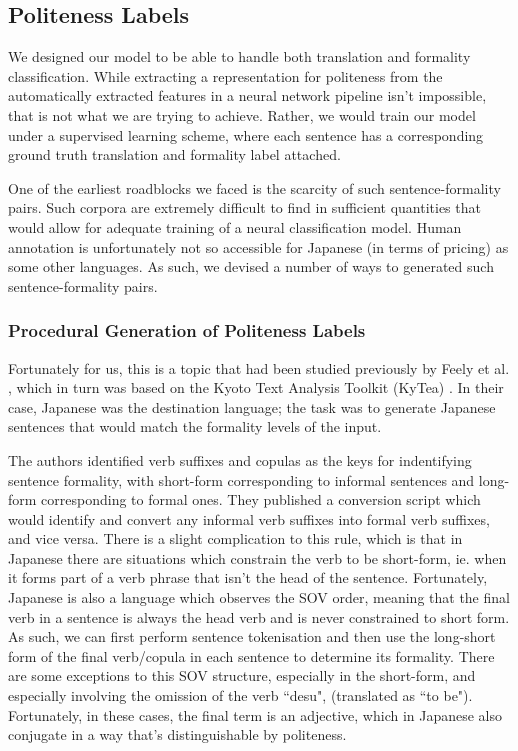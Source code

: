 \documentclass[11pt]{article}
\begin{document}
\subsection{Politeness Labels}

We designed our model to be able to handle both translation and formality classification. While extracting a representation for politeness from the automatically extracted features in a neural network pipeline isn't impossible, that is not what we are trying to achieve. Rather, we would train our model under a supervised learning scheme, where each sentence has a corresponding ground truth translation and formality label attached.

One of the earliest roadblocks we faced is the scarcity of such sentence-formality pairs. Such corpora are extremely difficult to find in sufficient quantities that would allow for adequate training of a neural classification model. Human annotation is unfortunately not so accessible for Japanese (in terms of pricing) as some other languages. As such, we devised a number of ways to generated such sentence-formality pairs.

\subsubsection{Procedural Generation of Politeness Labels}

Fortunately for us, this is a topic that had been studied previously by Feely et al. \cite{Feely:19}, which in turn was based on the Kyoto Text Analysis Toolkit (KyTea) \cite{Neubig:11}. In their case, Japanese was the destination language; the task was to generate Japanese sentences that would match the formality levels of the input. 

The authors identified verb suffixes and copulas as the keys for indentifying sentence formality, with short-form corresponding to informal sentences and long-form corresponding to formal ones. They published a conversion script which would identify and convert any informal verb suffixes into formal verb suffixes, and vice versa. There is a slight complication to this rule, which is that in Japanese there are situations which constrain the verb to be short-form, ie. when it forms part of a verb phrase that isn't the head of the sentence. Fortunately, Japanese is also a language which observes the SOV order, meaning that the final verb in a sentence is always the head verb and is never constrained to short form. As such, we can first perform sentence tokenisation and then use the long-short form of the final verb/copula in each sentence to determine its formality. There are some exceptions to this SOV structure, especially in the short-form, and especially involving the omission of the verb ``desu", (translated as ``to be"). Fortunately, in these cases, the final term is an adjective, which in Japanese also conjugate in a way that's distinguishable by politeness. 
\end{document}
